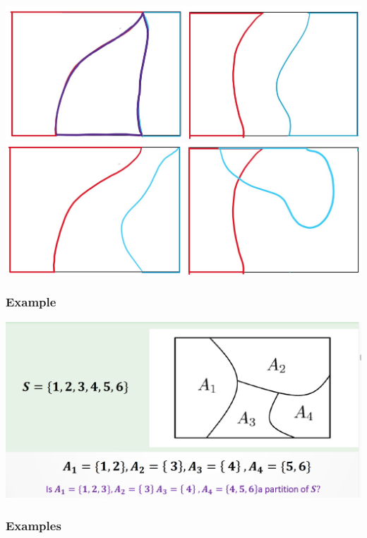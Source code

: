 \documentclass[compress]{beamer}
\begin{document}
\begin{frame}
\includegraphics[scale=.42]{figs/BlankVD6.jpg} 
   \includegraphics[scale=.32]{figs/BlankVD4.jpg} 
\end{frame}
\begin{frame}\frametitle{Example}
 \includegraphics[scale=.34]{figs/VDPartition.png} 
\end{frame}

\begin{frame}\frametitle{Examples}

\end{frame}
\end{document}
